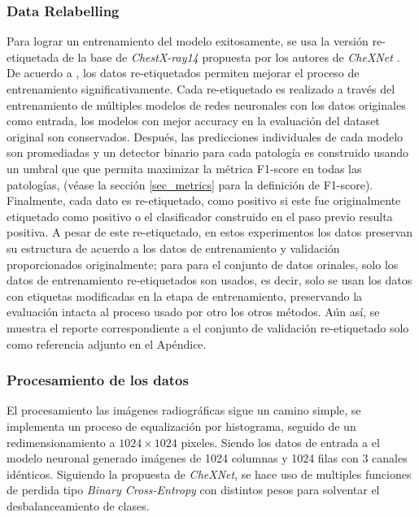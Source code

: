 {\subsubsection{Data Relabelling}
\label{ssec_relabelling}

Para lograr un entrenamiento del modelo exitosamente, se usa la versión re-etiquetada de la base de
\textit{ChestX-ray14} propuesta por los autores de \textit{CheXNet} \cite{rajpurkar2018deep}. De
acuerdo a \cite{rajpurkar2018deep}, los datos re-etiquetados permiten mejorar el proceso de entrenamiento
significativamente. Cada re-etiquetado es realizado a través del entrenamiento de múltiples modelos
de redes neuronales con los datos originales como entrada, los modelos con mejor accuracy en la
evaluación del dataset original son conservados. Después, las predicciones individuales de cada
modelo son promediadas y un detector binario para cada patología es construido usando un umbral que
que permita maximizar la métrica F1-score en todas las patologías, (véase la sección \ref{sec_metrics}
para la definición de F1-score). Finalmente, cada dato es re-etiquetado, como positivo si este fue
originalmente etiquetado como positivo o el clasificador construido en el paso previo resulta positiva.
A pesar de este re-etiquetado, en estos experimentos los datos preservan su estructura de acuerdo a
los datos de entrenamiento y validación proporcionados originalmente; para para el conjunto de datos
orinales, solo los datos de entrenamiento re-etiquetados son usados, es decir, solo se usan los datos
con etiquetas modificadas en la etapa de entrenamiento, preservando la evaluación intacta al proceso
usado por otro los otros métodos. Aún así, se muestra el reporte correspondiente a el conjunto de
validación re-etiquetado solo como referencia adjunto en el Apéndice.

\subsubsection{Procesamiento de los datos}

El procesamiento las imágenes radiográficas sigue un camino simple, se implementa un proceso de
equalización por histograma, seguido de un redimensionamiento a $1024 \times 1024$ pixeles. Siendo
los datos de entrada a el modelo neuronal generado imágenes de 1024  columnas y 1024 filas con 3
canales idénticos. Siguiendo la propuesta de \textit{CheXNet}, se hace uso de multiples funciones de
perdida tipo \textit{Binary Cross-Entropy} con distintos pesos para solventar el desbalanceamiento
de clases.

}
